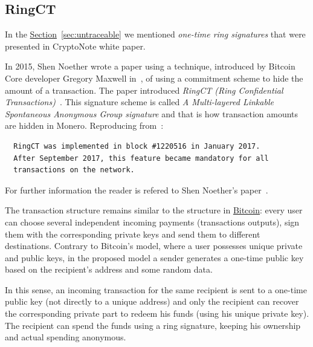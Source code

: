 \subsection{RingCT}
In the \hyperref[sec:untraceable]{Section}~\ref{sec:untraceable} we mentioned \emph{one-time ring signatures} that were presented in CryptoNote white paper.

In 2015, Shen Noether wrote a paper using a technique, introduced by Bitcoin Core developer Gregory Maxwell in~\cite{elements}, of using a commitment scheme to hide the amount of a transaction. The paper introduced \emph{RingCT (Ring Confidential Transactions)}~\cite{ringCT}. This signature scheme is called \emph{A Multi-layered Linkable Spontaneous Anonymous Group signature} and that is how transaction amounts are hidden in Monero. Reproducing from~\cite{getmonero}:

\begin{verbatim}
  RingCT was implemented in block #1220516 in January 2017.
  After September 2017, this feature became mandatory for all
  transactions on the network.
\end{verbatim}
For further information the reader is refered to Shen Noether's paper~\cite{ringCT}.

The transaction structure remains similar to the structure in \hyperref[sec:Bitcoin]{Bitcoin}: every user can choose several independent incoming payments (transactions outputs), sign them with the corresponding private keys and send them to different destinations. Contrary to Bitcoin’s model, where a user possesses unique private and public keys, in the proposed model a sender generates a one-time public key based on the recipient’s address and some random data.

In this sense, an incoming transaction for the same recipient is sent to a one-time public key (not directly  to a unique  address) and only the recipient can recover the corresponding private part to redeem his funds (using his unique private key). The recipient can spend the funds using a ring signature, keeping his ownership and actual spending anonymous.
\clearpage
\pagebreak

